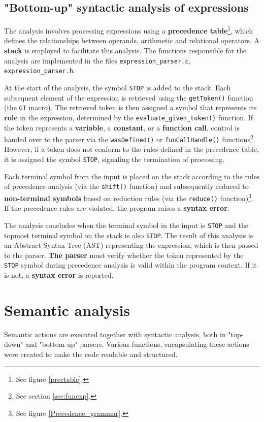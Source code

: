\documentclass[a4paper, 11pt]{article}
\begin{document}
\subsection{"Bottom-up" syntactic analysis of expressions}\label{sec:EXPRPARSER}
The analysis involves processing expressions using a \textbf{precedence table}\footnote{See figure \ref{prectable}.}, which defines the relationships between operands, arithmetic 
and relational operators. A \textbf{stack} is employed to facilitate this analysis. The functions responsible for the analysis are implemented 
in the files \verb|expression_parser.c|, \verb|expression_parser.h|.
\par
At the start of the analysis, the symbol \verb|STOP| is added to the stack. Each subsequent element of the expression is retrieved using the \verb|getToken()| 
function (the \verb|GT| macro). The retrieved token is then assigned a symbol that represents its \textbf{role} in the expression, determined by the 
\verb|evaluate_given_token()| function. If the token represents a \textbf{variable}, a \textbf{constant}, or a \textbf{function call}, control is handed 
over to the parser via the \verb|wasDefined()| or \verb|funCallHandle()| functions\footnote{See section \ref{sec:funexp}.}. However, if a token does not conform to the rules defined in the precedence 
table, it is assigned the symbol \verb|STOP|, signaling the termination of processing.
\par
Each terminal symbol from the input is placed on the stack according to the rules of precedence analysis 
(via the \verb|shift()| function) and subsequently reduced to \textbf{non-terminal symbols} based on reduction rules (via the \verb|reduce()| function)\footnote{See figure \ref{Precedence_grammar}.}. 
If the precedence rules are violated, the program raises a \textbf{syntax error}.
\par
The analysis concludes when the terminal symbol in the input is \verb|STOP| and the topmost terminal symbol 
on the stack is also \verb|STOP|. The result of this analysis is an Abstract Syntax Tree (AST) representing the expression, 
which is then passed to the parser. \textbf{The parser} must verify whether the token represented by the \verb|STOP| symbol 
during precedence analysis is valid within the program context. If it is not, a \textbf{syntax error} is reported.

\section{Semantic analysis}\label{sec:SEMANTIC}
Semantic actions are executed together with syntactic analysis, both in "top-down" and "bottom-up" parsers.
Various functions, encapsulating these actions were created to make the code readable and structured. 
\end{document}
